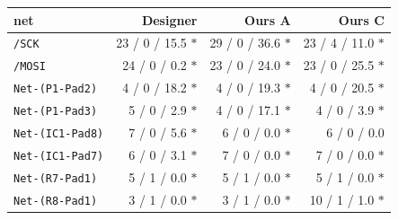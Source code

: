 \begin{tabular}{lrrr}
\toprule
net & Designer & Ours A & Ours C \\
\midrule
\texttt{/SCK} & 23 / 0 / 15.5 $\ast$ & 29 / 0 / 36.6 $\ast$ & 23 / 4 / 11.0 $\ast$ \\
\texttt{/MOSI} & 24 / 0 / 0.2 $\ast$ & 23 / 0 / 24.0 $\ast$ & 23 / 0 / 25.5 $\ast$ \\
\texttt{Net-(P1-Pad2)} & 4 / 0 / 18.2 $\ast$ & 4 / 0 / 19.3 $\ast$ & 4 / 0 / 20.5 $\ast$ \\
\texttt{Net-(P1-Pad3)} & 5 / 0 / 2.9 $\ast$ & 4 / 0 / 17.1 $\ast$ & 4 / 0 / 3.9 $\ast$ \\
\texttt{Net-(IC1-Pad8)} & 7 / 0 / 5.6 $\ast$ & 6 / 0 / 0.0 $\ast$ & 6 / 0 / 0.0 \\
\texttt{Net-(IC1-Pad7)} & 6 / 0 / 3.1 $\ast$ & 7 / 0 / 0.0 $\ast$ & 7 / 0 / 0.0 $\ast$ \\
\texttt{Net-(R7-Pad1)} & 5 / 1 / 0.0 $\ast$ & 5 / 1 / 0.0 $\ast$ & 5 / 1 / 0.0 $\ast$ \\
\texttt{Net-(R8-Pad1)} & 3 / 1 / 0.0 $\ast$ & 3 / 1 / 0.0 $\ast$ & 10 / 1 / 1.0 $\ast$ \\
\bottomrule
\end{tabular}
